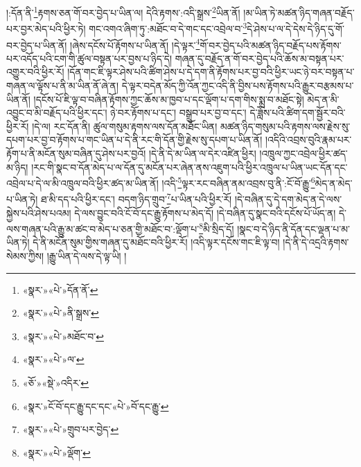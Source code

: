 །:དོན་ནི་\footnote{«སྣར་»«པེ་»དོན་ནོ་}རྟགས་ཅན་གོ་བར་བྱེད་པ་ཡིན་ལ། དེའི་རྟགས་:འདི་སྒྲས་\footnote{«སྣར་»«པེ་»ནི་སྒྲས་}ཡིན་ནོ། །མ་ཡིན་ཏེ་མཚན་ཉིད་གཞན་བརྗོད་པར་བྱར་མེད་པའི་ཕྱིར་ཏེ། གང་འགའ་ཞིག་ཏུ་:མཐོང་བ་དེ་གང་དང་འབྲེལ་བ་\footnote{«སྣར་»«པེ་»མཐོང་བ་}དེ་ཤེས་པ་ལ་དེ་དེས་དེ་ཉིད་དུ་གོ་བར་བྱེད་པ་ཡིན་ནོ། །ཞེས་དངོས་པོ་རྟོགས་པ་ཡིན་ནོ། །དེ་ལྟར་\footnote{«སྣར་»«པེ་»ལ་}གོ་བར་བྱེད་པའི་མཚན་ཉིད་བརྗོད་པས་རྟོགས་པར་འདོད་པའི་ངག་གི་ཚུལ་བསྟན་པར་བྱས་པ་ཉིད་དེ། གཞན་དུ་བརྗོད་ན་གོ་བར་བྱེད་པའི་ཆོས་མ་བསྟན་པར་འགྱུར་བའི་ཕྱིར་རོ། །དོན་གང་ཇི་ལྟར་ཤེས་པའི་ཚིག་ཤེས་པ་དེ་དག་ནི་རྟོགས་པར་བྱ་བའི་ཕྱིར་ཡང་ཉེ་བར་བསྟན་པ་གཞན་ལ་ལྟོས་པ་ནི་མ་ཡིན་ནོ་ཞེ་ན། དེ་ལྟར་བདེན་མོད་ཀྱི་འོན་ཀྱང་འདི་ནི་བྱིས་པས་རྟོགས་པའི་རྒྱུར་བརྩམས་པ་ཡིན་ནོ། །དངོས་པོ་ཇི་ལྟ་བ་བཞིན་རྟོགས་ཀྱང་ཆོས་མ་ཁྱབ་པ་དང་ལྡོག་པ་དག་གིས་སྨྲ་བ་མཐོང་སྟེ། མེད་ན་མི་འབྱུང་བ་མི་བརྗོད་པའི་ཕྱིར་དང་། ཉེ་བར་རྟོགས་པ་དང་། བསྒྲུབ་པར་བྱ་བ་དང་། དེ་ཟློས་པའི་ཚིག་དག་སྦྱོར་བའི་ཕྱིར་རོ། །དེ་ལ། རང་དོན་ནི། ཚུལ་གསུམ་རྟགས་ལས་དོན་མཐོང་ཡིན། མཚན་ཉིད་གསུམ་པའི་རྟགས་ལས་རྗེས་སུ་དཔག་པར་བྱ་བ་རྟོགས་པ་གང་ཡིན་པ་དེ་ནི་རང་གི་དོན་གྱི་རྗེས་སུ་དཔག་པ་ཡིན་ནོ། །འདིའི་འབྲས་བུའི་རྣམ་པར་རྟོག་པ་ནི་མངོན་སུམ་བཞིན་དུ་ཤེས་པར་བྱའོ། །དེ་ནི་དེ་མ་ཡིན་ལ་དེར་འཛིན་ཕྱིར། །འཁྲུལ་ཀྱང་འབྲེལ་ཕྱིར་ཚད་མ་ཉིད། །རང་གི་སྣང་བ་དོན་མེད་པ་ལ་དོན་དུ་མངོན་པར་ཞེན་ནས་འཇུག་པའི་ཕྱིར་འཁྲུལ་པ་ཡིན་ཡང་དོན་དང་འབྲེལ་པ་དེ་ལ་མི་འཁྲུལ་བའི་ཕྱིར་ཚད་མ་ཡིན་ནོ། །འདི་\footnote{«ཅོ་»«སྡེ་»འདིར་}ལྟར་རང་བཞིན་ནམ་འབྲས་བུ་ནི་:ངོ་བོ་རྒྱུ་\footnote{«སྣར་»ངོ་བོ་དང་རྒྱུ་དང་དང་«པེ་»བོ་དང་རྒྱུ་}མེད་ན་མེད་པ་ཡིན་ཏེ། ཐ་མི་དད་པའི་ཕྱིར་དང་། བདག་ཉིད་གྲུབ་\footnote{«སྣར་»«པེ་»གྲུབ་པར་བྱེད་}པ་ཡིན་པའི་ཕྱིར་རོ། །དེ་བཞིན་དུ་དེ་དག་མེད་ན་དེ་ལས་སྐྱེས་པའི་ཤེས་པའམ། དེ་ལས་བྱུང་བའི་ངོ་བོ་དང་རྒྱུ་རྟོགས་པ་མེད་དོ། །དེ་བཞིན་དུ་སྣང་བའི་དངོས་པོ་ཡོད་ན། དེ་ལས་གཞན་པའི་རྒྱུ་མ་ཚང་བ་མེད་པ་ཅན་གྱི་མཐོང་བ་:ལྡོག་པ་\footnote{«སྣར་»«པེ་»ལྡོག་}མི་སྲིད་དོ། །སྣང་བ་དེ་ཉིད་ནི་དོན་དང་ལྡན་པ་མ་ཡིན་ཏེ། དེ་ནི་མངོན་སུམ་གྱིས་གཞན་དུ་མཐོང་བའི་ཕྱིར་རོ། །འདི་ལྟར་དངོས་གང་ཇི་ལྟ་བ། །དེ་ནི་དེ་འདྲའི་རྟགས་སེམས་ཀྱིས། །རྒྱུ་ཡིན་དེ་ལས་དེ་ལྟ་ཡི། །
